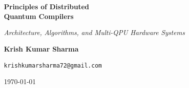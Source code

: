 \begin{titlepage}
    \centering
    \vspace*{2cm}
    
    {\Huge\bfseries\color{darkblue} Principles of Distributed\\[0.3em] Quantum Compilers\par}
    
    \vspace{1.5cm}
    {\Large\itshape Architecture, Algorithms, and Multi-QPU Hardware Systems\par}
    
    \vspace{2.5cm}
    
    {\Large\textbf{Krish Kumar Sharma}\par}
    {\texttt{krishkumarsharma72@gmail.com}\par}
    
    \vfill
    
    \begin{center}
    \end{center}
    
    \vspace{1.0cm}
    {\large\today\par}
    \vspace*{1.5cm}
\end{titlepage}
